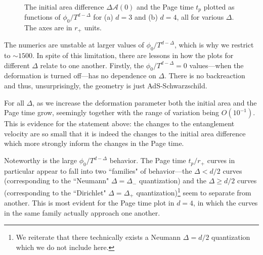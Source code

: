 \documentclass[12pt,a4paper]{article}
\begin{document}
{
\begin{figure}
\centering
{}\\\vspace{0.4cm}
\caption{The initial area difference $\Delta\mathcal{A}(0)$ and the Page time $t_p$ plotted as functions of $\phi_0/T^{d-\Delta}$ for (a) $d = 3$ and (b) $d = 4$, all for various $\Delta$. The axes are in $r_+$ units.}
\label{figs:areasAndPageTimes}
\end{figure}
}

The numerics are unstable at larger values of $\phi_0/T^{d-\Delta}$, which is why we restrict to $\sim 1500$. In spite of this limitation, there are lessons in how the plots for different $\Delta$ relate to one another. Firstly, the $\phi_0/T^{d-\Delta} = 0$ values---when the deformation is turned off---has no dependence on $\Delta$. There is no backreaction and thus, unsurprisingly, the geometry is just AdS-Schwarzschild.

For all $\Delta$, as we increase the deformation parameter both the initial area and the Page time grow, seemingly together with the range of variation being $O(10^{-1})$. This is evidence for the statement above: the changes to the entanglement velocity are so small that it is indeed the changes to the initial area difference which more strongly inform the changes in the Page time.

Noteworthy is the large $\phi_0/T^{d-\Delta}$ behavior. The Page time $t_p/r_+$ curves in particular appear to fall into two ``families" of behavior---the $\Delta < d/2$ curves (corresponding to the ``Neumann" $\Delta = \Delta_-$ quantization) and the $\Delta \geq d/2$ curves (corresponding to the ``Dirichlet" $\Delta = \Delta_+$ quantization)\footnote{We reiterate that there technically exists a Neumann $\Delta = d/2$ quantization which we do not include here.} seem to separate from another. This is most evident for the Page time plot in $d = 4$, in which the curves in the same family actually approach one another.
\end{document}
